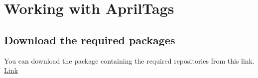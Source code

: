 \documentclass[letta4 paper]{article}
\begin{document}



\clearpage
\section{Working with AprilTags}
\subsection{Download the required packages }
You can download the package containing the required repositories from this link. \href{https://drive.google.com/open?id=1yCs7dbwPPBzjbPul1k0SwnOg4jth4hTx}{Link}
\end{document}
